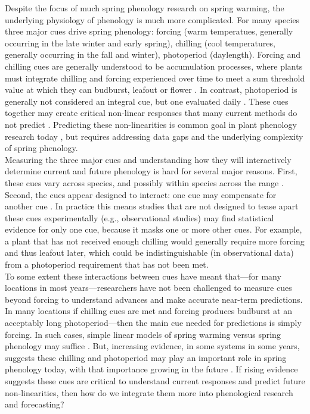 \documentclass[11pt,letter]{article}
\begin{document}
Despite the focus of much spring phenology research on spring warming, the underlying physiology of phenology is much more complicated. For many species three major cues drive spring phenology: forcing (warm temperatues, generally occurring in the late winter and early spring), chilling (cool temperatures, generally occurring in the fall and winter), photoperiod (daylength). Forcing and chilling cues are generally understood to be accumulation processes, where plants must integrate chilling and forcing experienced over time to meet a sum threshold value at which they can budburst, leafout or flower \citep{Chuine2000}. In contrast, photoperiod is generally not considered an integral cue, but one evaluated daily \citep{Singh:2017}. These cues together may create critical non-linear responses that many current methods do not predict \citep[e.g.,]{Ellwood2012}. Predicting these non-linearities is common goal in plant phenology research today \citep{gusewell2017, martlusch2017,gauzere2019,chen2019,keenan2019}, but requires addressing data gaps and the underlying complexity of spring phenology. \\

Measuring the three major cues and understanding how they will interactively determine current and future phenology is hard for several major reasons. First, these cues vary across species, and possibly within species across the range  \citep{vitasse2009,harrington2015}. Second, the cues appear designed to interact: one cue may compensate for another cue \citep{Chuine2000}. In practice this means studies that are not designed to tease apart these cues experimentally (e.g., observational studies) may find statistical evidence for only one cue, because it masks one or more other cues. For example, a plant that has not received enough chilling would generally require more forcing and thus leafout later, which could be indistinguishable (in observational data) from a photoperiod requirement that has not been met. \\

To some extent these interactions between cues have meant that---for many locations in most years---researchers have not been challenged to measure cues beyond forcing to understand advances and make accurate near-term predictions. In many locations if chilling cues are met and forcing produces budburst at an acceptably long photoperiod---then the main cue needed for predictions is simply forcing. In such cases, simple linear models of spring warming versus spring phenology may suffice \citep[e.g.,]{Ellwood2012}. But, increasing evidence, in some systems in some years, suggests these chilling and photoperiod may play an important role in spring phenology today, with that importance growing in the future \citep{chuine2016,gauzere2019}. If rising evidence suggests these cues are critical to understand current responses and predict future non-linearities, then how do we integrate them more into phenological research and forecasting? \\%
\end{document}
